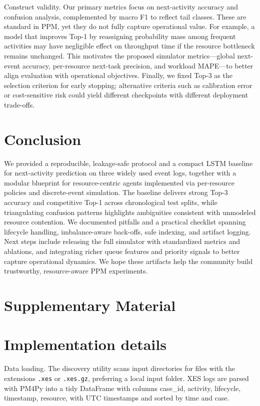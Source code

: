 \documentclass{article}
\theoremstyle{plain}
\theoremstyle{definition}
\theoremstyle{remark}
\begin{document}
	Construct validity. Our primary metrics focus on next-activity accuracy and confusion analysis, complemented by macro F1 to reflect tail classes. These are standard in PPM, yet they do not fully capture operational value. For example, a model that improves Top-1 by reassigning probability mass among frequent activities may have negligible effect on throughput time if the resource bottleneck remains unchanged. This motivates the proposed simulator metrics---global next-event accuracy, per-resource next-task precision, and workload MAPE---to better align evaluation with operational objectives. Finally, we fixed Top-3 as the selection criterion for early stopping; alternative criteria such as calibration error or cost-sensitive risk could yield different checkpoints with different deployment trade-offs.
	
	\section{Conclusion}
	\label{sec:conclusion}
	We provided a reproducible, leakage-safe protocol and a compact LSTM baseline for next-activity prediction on three widely used event logs, together with a modular blueprint for resource-centric agents implemented via per-resource policies and discrete-event simulation. The baseline delivers strong Top-3 accuracy and competitive Top-1 across chronological test splits, while triangulating confusion patterns highlights ambiguities consistent with unmodeled resource contention. We documented pitfalls and a practical checklist spanning lifecycle handling, imbalance-aware back-offs, safe indexing, and artifact logging. Next steps include releasing the full simulator with standardized metrics and ablations, and integrating richer queue features and priority signals to better capture operational dynamics. We hope these artifacts help the community build trustworthy, resource-aware PPM experiments.
	
	
	
	
	\appendix
	
	\section*{\LARGE Supplementary Material}
	\label{sec:appendix}
	
	\section{Implementation details}
	Data loading. The discovery utility scans input directories for files with the extensions \texttt{.xes} or \texttt{.xes.gz}, preferring a local input folder. XES logs are parsed with PM4Py \citep{berti2020pm4py} into a tidy DataFrame with columns case\_id, activity, lifecycle, timestamp, resource, with UTC timestamps and sorted by time and case.
	
\end{document}
